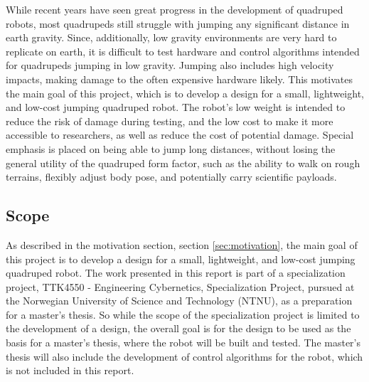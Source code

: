 While recent years have seen great progress in the development of quadruped robots, most quadrupeds still struggle with jumping any significant distance in earth gravity. Since, additionally, low gravity environments are very hard to replicate on earth, it is difficult to test hardware and control algorithms intended for quadrupeds jumping in low gravity. Jumping also includes high velocity impacts, making damage to the often expensive hardware likely. This motivates the main goal of this project, which is to develop a design for a small, lightweight, and low-cost jumping quadruped robot. The robot's low weight is intended to reduce the risk of damage during testing, and the low cost to make it more accessible to researchers, as well as reduce the cost of potential damage. Special emphasis is placed on being able to jump long distances, without losing the general utility of the quadruped form factor, such as the ability to walk on rough terrains, flexibly adjust body pose, and potentially carry scientific payloads.

\subsection{Scope}
\label{sec:scope}

As described in the motivation section, section \ref{sec:motivation}, the main goal of this project is to develop a design for a small, lightweight, and low-cost jumping quadruped robot. The work presented in this report is part of a specialization project, TTK4550 - Engineering Cybernetics, Specialization Project, pursued at the Norwegian University of Science and Technology (NTNU), as a preparation for a master's thesis. So while the scope of the specialization project is limited to the development of a design, the overall goal is for the design to be used as the basis for a master's thesis, where the robot will be built and tested. The master's thesis will also include the development of control algorithms for the robot, which is not included in this report.

